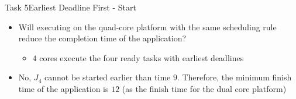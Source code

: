 \begin{frame}[allowframebreaks]{Task 5}{Earliest Deadline First - Start\vspace{0.5cm}}
  \begin{tasknoinc}
    \begin{itemize}
      \item Will executing on the \alert{quad-core platform} with the same scheduling rule reduce the completion time of the application?
        \begin{itemize}
          \item $4$ cores execute the four ready tasks with earliest deadlines
        \end{itemize}
    \end{itemize}
  \end{tasknoinc}
  \begin{solution}
    \begin{itemize}
      \item No, $J_4$ \alert{cannot} be started earlier than time $9$. Therefore, the \alert{minimum finish time} of the application is $12$ (as the finish time for the dual core platform)
    \end{itemize}
  \end{solution}
\end{frame}
